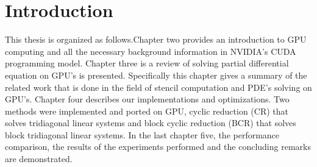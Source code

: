 \chapter{Introduction}

This thesis is organized as follows.Chapter two provides an introduction to GPU computing and all the necessary background information in NVIDIA’s CUDA programming model. Chapter three is a review of solving partial differential equation on GPU’s is presented. Specifically this chapter gives a summary of the related work that is done in the field of stencil computation and PDE’s solving on GPU’s. Chapter four describes our implementations and optimizations. Two methods were implemented and ported on GPU, cyclic reduction (CR) that solves tridiagonal linear systems and block cyclic reduction (BCR) that solves block tridiagonal linear systems. In the last chapter five, the performance comparison, the results of the experiments performed and the concluding remarks are demonstrated.

